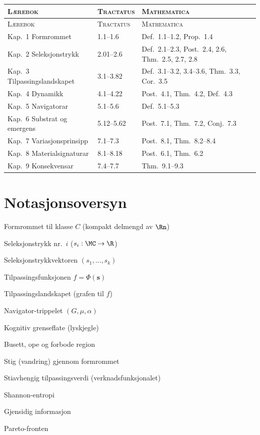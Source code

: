 \medskip
\begin{small}
\begin{longtable}{@{}p{38mm}p{20mm}p{25mm}@{}}
\toprule
\textsc{L\ae rebok} & \textsc{Tractatus} & \textsc{Mathematica} \\
\midrule
\endfirsthead
\toprule
\textsc{L\ae rebok} & \textsc{Tractatus} & \textsc{Mathematica} \\
\midrule
\endhead
\bottomrule
\endfoot
Kap.~1 Formrommet   & 1.1--1.6  & Def.~1.1--1.2, Prop.~1.4 \\
Kap.~2 Seleksjonstrykk & 2.01--2.6 & Def.~2.1--2.3, Post.~2.4, 2.6, Thm.~2.5, 2.7, 2.8 \\
Kap.~3 Tilpassingslandskapet & 3.1--3.82 & Def.~3.1--3.2, 3.4--3.6, Thm.~3.3, Cor.~3.5 \\
Kap.~4 Dynamikk     & 4.1--4.22 & Post.~4.1, Thm.~4.2, Def.~4.3 \\
Kap.~5 Navigatorar  & 5.1--5.6  & Def.~5.1--5.3 \\
Kap.~6 Substrat og emergens & 5.12--5.62 & Post.~7.1, Thm.~7.2, Conj.~7.3 \\
Kap.~7 Variasjonsprinsipp & 7.1--7.3 & Post.~8.1, Thm.~8.2--8.4 \\
Kap.~8 Materialsignaturar & 8.1--8.18 & Post.~6.1, Thm.~6.2 \\
Kap.~9 Konsekvensar & 7.4--7.7  & Thm.~9.1--9.3 \\
\end{longtable}
\end{small}


\chapter{Notasjonsoversyn}

\begin{description}[style=nextline, leftmargin=2em]
  \item[$\MC$] Formrommet til klasse $C$ (kompakt delmengd av $\Rn$)
  \item[$s_i$] Seleksjonstrykk nr.~$i$ ($s_i : \MC \to \R$)
  \item[$\bm{s}$] Seleksjonstrykkvektoren $(s_1, \ldots, s_k)$
  \item[$f$] Tilpassingsfunksjonen $f = \Phi(\bm{s})$
  \item[$\FitLand$] Tilpassingslandskapet (grafen til $f$)
  \item[$\Nav$] Navigator-trippelet $(G, \mu, \alpha)$
  \item[$\CogBound$] Kognitiv grenseflate (lyskjegle)
  \item[$B, O, F$] Busett, ope og forbode region
  \item[$\gamma$] Stig (vandring) gjennom formrommet
  \item[{$S[\gamma]$}] Stiavhengig tilpassingsverdi (verknadsfunksjonalet)
  \item[$\Ent$] Shannon-entropi
  \item[$\MI$] Gjensidig informasjon
  \item[$\Pareto$] Pareto-fronten
\end{description}
